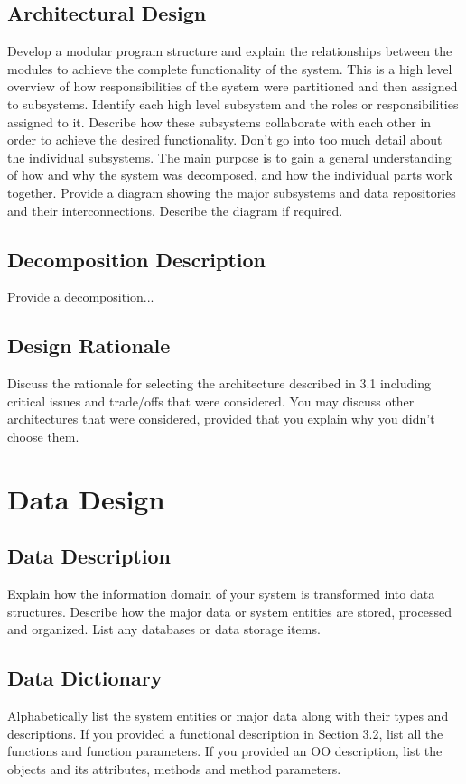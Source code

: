\documentclass[titlepage]{article}
\begin{document}
\subsection{Architectural Design}
Develop a modular program structure and explain the relationships between the modules to achieve the complete functionality of the system. This is a high level overview of how responsibilities of the system were partitioned and then assigned to subsystems. Identify each
high level subsystem and the roles or responsibilities assigned to it. Describe how these subsystems collaborate with each other in order to achieve the desired functionality. Don’t go into too much detail about the individual subsystems. The main purpose is to gain a general understanding of how and why the system was decomposed, and how the individual parts work together. Provide a diagram showing the major subsystems and data repositories and their interconnections. Describe the diagram if required.

\subsection{Decomposition Description}
Provide a decomposition...

\subsection{Design Rationale}
Discuss the rationale for selecting the architecture described in 3.1 including critical issues and trade/offs that were considered. You may discuss other architectures that were considered, provided that you explain why you didn’t choose them.

\section{Data Design}
\subsection{Data Description}
Explain how the information domain of your system is transformed into data structures. Describe how the major data or system entities are stored, processed and organized. List any databases or data storage items.

\subsection{Data Dictionary}
Alphabetically list the system entities or major data along with their types and descriptions. If you provided a functional description in Section 3.2, list all the functions and function parameters. If you provided an OO description, list the objects and its attributes, methods and method parameters.
\end{document}
